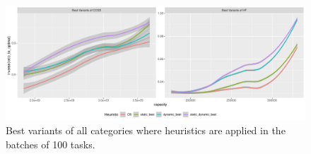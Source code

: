 \documentclass[sigconf]{acmart}
\begin{document}
{		
		\begin{figure}[htb]
			\includegraphics[scale=0.5]{./results/plots/inverse_ratio_to_optimal_batch-best.pdf}
			\caption{Best variants of all categories where heuristics are applied in the batches of 100 tasks.}
			\label{fig:best_variants_batch}
		\end{figure}
		
		
		
		
		
}
\end{document}
